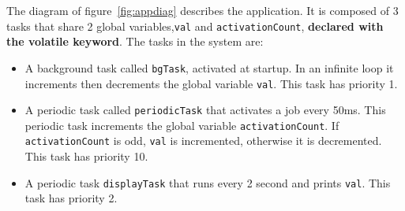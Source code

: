 \documentclass[11pt]{report}
\begin{document}
The diagram of figure~\ref{fig:appdiag} describes the application.
It is composed of 3 tasks that share 2 global variables,\texttt{val} and \texttt{activationCount}, {\bf declared with the volatile keyword}.
The tasks in the system are:
\begin{itemize}
  \item A background task called \texttt{bgTask}, activated at startup. In an infinite loop it increments then decrements the global variable \texttt{val}. This task has priority 1.
  \item A periodic task called \texttt{periodicTask} that activates a job every 50ms. This periodic task increments the global variable \texttt{activationCount}. If \texttt{activationCount} is odd, \texttt{val} is incremented, otherwise it is decremented. This task has priority 10.
  \item A periodic task \texttt{displayTask} that runs every 2 second and prints \texttt{val}. This task has priority 2.
\end{itemize}

\def\alarm#1#2{
  \node[alarm](#1) [#2] {};
  \coordinate (a) at ($(#1.north)$);
  \coordinate (b) at ($(#1.north east)$);
  \coordinate (c) at ($(#1.north west)$);
  \coordinate (d) at ($(#1)$);
  \draw[thick] ($(a)+(-0.1,0)$) rectangle ($(a)+(0.1,0.1)$);
  \draw[rotate=-45,thick] ($(b)+(-0.05,0)$) rectangle ($(b)+(0.05,0.1)$);
  \draw[rotate=45,thick] ($(c)+(-0.05,0)$) rectangle ($(c)+(0.05,0.1)$);
  \draw ($(d)+(0.3,0)$) -- (d) -- ($(d)+(0,0.3)$);
  \node [font=\scriptsize,below=0.5mm of #1] {{\em Alarm}}
}

\def\sharedvar#1#2#3{
  \node (#1) [#2] {#1};
  \coordinate (a) at ($(#1.north #3) + (0,0.2)$);
  \coordinate (b) at ($(#1.south #3) + (0,-0.2)$);
  \draw[ultra thick] (a) -- (b);
  \draw ($(a)+(-0.1,0)$) -- ($(a)+(0.1,0)$);
  \draw ($(b)+(-0.1,0)$) -- ($(b)+(0.1,0)$)
}

\def\varrect#1{
  \draw ($(#1.south west)$) rectangle ($(#1.north east)$)
}
\end{document}
